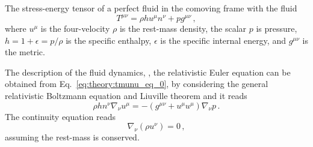 The stress-energy tensor of a perfect fluid in the comoving frame with the fluid
%
\begin{equation}
T^{\mu\nu} = \rho h u^{\mu}n^{\nu} + p g^{\mu\nu}\, ,
\label{eq:theory:tmunu_perf}
\end{equation}
%
where $u^{\mu}$ is the four-velocity
$\rho$ is the rest-mass density, the scalar $p$ is pressure, 
$h = 1 + \epsilon = p/\rho$ is the specific enthalpy, 
$\epsilon$ is the specific internal energy, and $g^{\mu\nu}$ is the metric.

The description of the fluid dynamics, \ie, the relativistic Euler equation 
can be obtained from Eq.~\eqref{eq:theory:tmunu_eq_0}, 
by considering the general relativistic Boltzmann equation and Liuville theorem 
and it reads 
%
\begin{equation}
\rho h n^{\nu} \nabla_{\nu}u^{\mu} = - (g^{\mu\nu} + u^{\mu}u^{\mu})\nabla_{\nu}p\, .
\end{equation}
%
The continuity equation reads 
%
\begin{equation}
\nabla_{\nu}(\rho u^{\nu}) = 0\, ,
\label{eq:theory:contineq}
\end{equation}
%
assuming the rest-mass is conserved.



